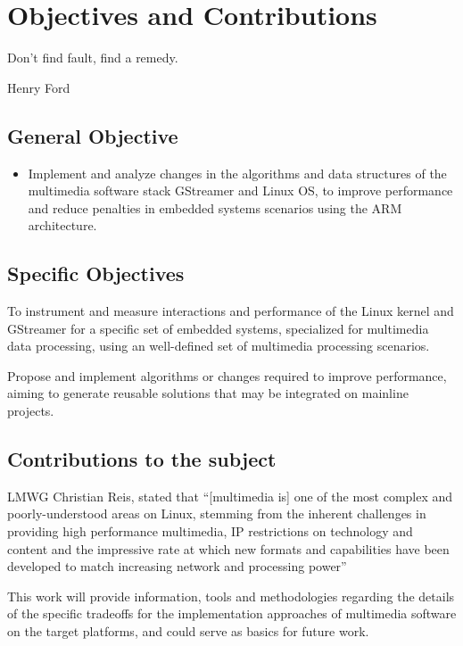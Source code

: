 \chapter{Objectives and Contributions}
\epigraph{Don't find fault, find a remedy.}{Henry Ford}

\section{General Objective}

\begin{itemize}
\item Implement and analyze changes in the algorithms and data structures of the multimedia software stack GStreamer and Linux \acl{OS}, to improve performance and reduce penalties in embedded systems scenarios using the \ac{ARM} architecture.
\end{itemize}

\section{Specific Objectives}
\begin{itemize*}
\item To instrument and measure interactions and performance of the Linux kernel and GStreamer for a specific set of embedded systems, specialized for multimedia data processing, using an well-defined set of multimedia processing scenarios.
\item Propose and implement algorithms or changes required to improve performance, aiming to generate reusable solutions that may be integrated on mainline projects.
\end{itemize*}

\section{Contributions to the subject}
\ac{LMWG} Christian Reis, stated that ``[multimedia is] one of the most complex and poorly-understood areas on Linux, stemming from the inherent challenges in providing high performance multimedia, IP restrictions on technology and content and the impressive rate at which new formats and capabilities have been developed to match increasing network and processing power'' \cite{Reis:vn}

This work will provide information, tools and methodologies regarding the details of the specific tradeoffs for the implementation approaches of multimedia software on the target platforms, and could serve as basics for future work.

